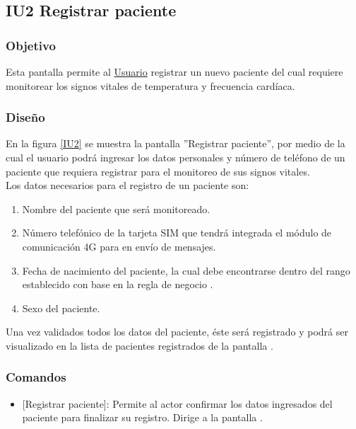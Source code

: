 \subsection{IU2 Registrar paciente}

\subsubsection{Objetivo}
	
Esta pantalla permite al \hyperlink{actor:usuario}{Usuario} registrar un nuevo paciente del cual requiere monitorear los signos vitales de temperatura y frecuencia cardíaca.

\subsubsection{Diseño}
En la figura \ref{IU2} se muestra la pantalla ''Registrar paciente'', por medio de la cual el usuario podrá ingresar los datos personales y número de teléfono de un paciente que requiera registrar para el monitoreo de sus signos vitales.\\

Los datos necesarios para el registro de un paciente son:
\begin{enumerate}
	\item Nombre del paciente que será monitoreado.
	\item Número telefónico de la tarjeta SIM que tendrá integrada el módulo de comunicación 4G para en envío de mensajes.
	\item Fecha de nacimiento del paciente, la cual debe encontrarse dentro del rango establecido con base en la regla de negocio .
	\item Sexo del paciente.
\end{enumerate}

Una vez validados todos los datos del paciente, éste será registrado y podrá ser visualizado en la lista de pacientes registrados de la pantalla .

    

\subsubsection{Comandos}
	\begin{itemize}
		\item \btnRegistrar{} [Registrar paciente]: Permite al actor confirmar los datos ingresados del paciente para finalizar su registro. Dirige a la pantalla .
	\end{itemize}
\clearpage
